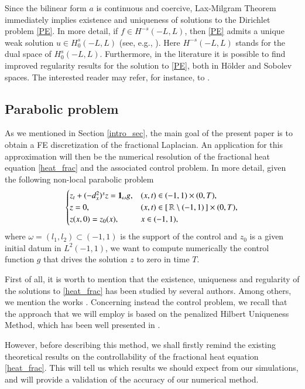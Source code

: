 Since the bilinear form $a$ is continuous and coercive, Lax-Milgram Theorem immediately implies existence and uniqueness of solutions to the Dirichlet problem \eqref{PE}. In more detail, if $f\in H^{-s}(-L,L)$, then \eqref{PE} admits a unique weak solution $u\in H_0^s(-L,L)$ (see, e.g., \cite[Proposition 2.1]{biccari2017local}). Here $H^{-s}(-L,L)$ stands for the dual space of $H^s_0(-L,L)$. Furthermore, in the literature it is possible to find improved regularity results for the solution to \eqref{PE}, both in H\"older and Sobolev spaces. The interested reader may refer, for instance, to \cite{acosta2017fractional,biccari2017local,leonori2015basic,ros2014dirichlet,ros2014extremal}.

\subsection{Parabolic problem}

As we mentioned in Section \ref{intro_sec}, the main goal of the present paper is to obtain a FE discretization of the fractional Laplacian. An application for this approximation will then be the numerical resolution of the fractional heat equation \eqref{heat_frac} and the associated control problem. In more detail, given the following non-local parabolic problem 
\begin{align*}
	\begin{cases}
		z_t+(-d_x^2)^{s}z =\mathbf{1}_\omega g, & (x,t)\in (-1,1)\times (0,T), 
		\\
		z=0, & (x,t)\in [\,\mathbb{R} \setminus (-1,1)\,]\times (0,T), 
		\\
		z(x,0)=z_0(x), & x\in (-1,1),
	\end{cases}
\end{align*}
where $\omega=(l_1,l_2)\subset (-1,1)$ is the support of the control and $z_0$ is a given initial datum in $L^2(-1,1)$, we want to compute numerically the control function $g$ that drives the solution $z$ to zero in time $T$. 

First of all, it is worth to mention that the existence, uniqueness and regularity of the solutions to \eqref{heat_frac} has been studied by several authors. Among others, we mention the works \cite{biccari2017local,fernandez2016boundary,leonori2015basic}. Concerning instead the control problem, we recall that the approach that we will employ is based on the penalized Hilbert Uniqueness Method, which has been well presented in \cite{boyer2013penalised}. 

However, before describing this method, we shall firstly remind the existing theoretical results on the controllability of the fractional heat equation \eqref{heat_frac}. This will tell us which results we should expect from our simulations, and will provide a validation of the accuracy of our numerical method.

